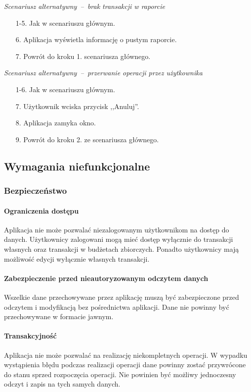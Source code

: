 \textit{Scenariusz alternatywny~--~brak transakcji w raporcie}
\begin{enumerate}
  \item[1-5.] Jak w scenariuszu głównym.
  \item[6.] Aplikacja wyświetla informację o pustym raporcie.
  \item[7.] Powrót do kroku 1. scenariusza głównego.
\end{enumerate}

\textit{Scenariusz alternatywny~--~przerwanie operacji przez użytkownika}
\begin{enumerate}
  \item[1-6.] Jak w scenariuszu głównym.
  \item[7.] Użytkownik wciska przycisk ,,Anuluj''.
  \item[8.] Aplikacja zamyka okno.
  \item[9.] Powrót do kroku 2. ze scenariusza głównego.
\end{enumerate}

\newpage
\subsection{Wymagania niefunkcjonalne}
\subsubsection{Bezpieczeństwo}

\paragraph{Ograniczenia dostępu\newline}
Aplikacja nie może pozwalać niezalogowanym użytkownikom na dostęp do danych. Użytkownicy zalogowani mogą mieć dostęp wyłącznie do transakcji własnych oraz transakcji w budżetach zbiorczych. Ponadto użytkownicy mają możliwość edycji wyłącznie własnych transakcji.

\paragraph{Zabezpieczenie przed nieautoryzowanym odczytem danych\newline}
Wszelkie dane przechowywane przez aplikację muszą być zabezpieczone przed odczytem i modyfikacją bez pośrednictwa aplikacji. Dane nie powinny być przechowywane w formacie jawnym.

\paragraph{Transakcyjność\newline}
Aplikacja nie może pozwalać na realizację niekompletnych operacji. W wypadku wystąpienia błędu podczas realizacji operacji dane powinny zostać przywrócone do stanu sprzed rozpoczęcia operacji. Nie powinien być możliwy jednoczesny odczyt i zapis na tych samych danych.

